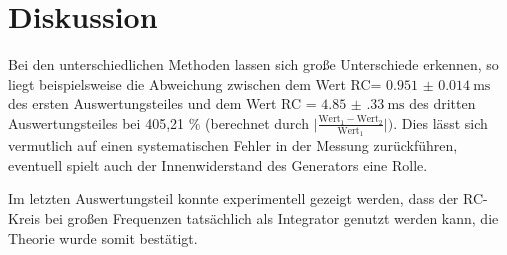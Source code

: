 \section{Diskussion}
\label{sec:Diskussion}
Bei den unterschiedlichen Methoden lassen sich große Unterschiede erkennen, so
liegt beispielsweise die Abweichung zwischen dem Wert RC=
$ \SI{0.951(14)}{\milli\second} $ des ersten Auswertungsteiles und dem Wert
RC = $ \SI{4.85(33)}{\milli\second} $ des dritten Auswertungsteiles bei 405,21
\% (berechnet durch $\lvert\frac{\text{Wert}_1-\text{Wert}_2}{\text{Wert}_1}\rvert)$.
Dies lässt sich vermutlich auf einen systematischen Fehler in der Messung zurückführen,
eventuell spielt auch der Innenwiderstand des Generators eine Rolle.

\noindent Im letzten Auswertungsteil konnte experimentell gezeigt werden, dass der RC-Kreis
bei großen Frequenzen tatsächlich als Integrator genutzt werden kann, die Theorie
wurde somit bestätigt.
